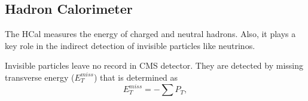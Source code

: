 
\subsection{Hadron Calorimeter}



The HCal measures the energy of charged and neutral hadrons. Also, it plays a key role in the indirect detection of invisible particles like neutrinos. 

Invisible particles leave no record in CMS detector. They are detected by missing transverse energy ($E_T^{miss}$) that is determined as 
\begin{equation}\label{eq:MET}
  E_T^{miss} = - \sum P_T,
\end{equation}


